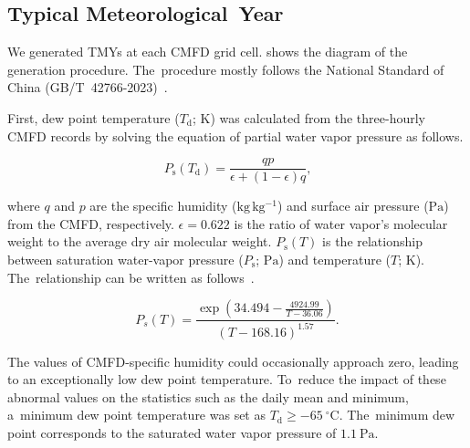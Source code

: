\documentclass[atmosphere,article,accept,pdftex,moreauthors]{Definitions/mdpi}
\begin{document}
\subsection{Typical Meteorological~Year}\label{sec:datamethods:tmy}

We generated TMYs at each CMFD grid cell.  shows the diagram of the generation procedure. The~procedure mostly follows the National Standard of China (GB/T~42766-2023)~\cite{GBT42766-2023}.

First, dew point temperature (\(T_\mathrm{d}\); \(\mathrm{K}\)) was calculated from the three-hourly CMFD records by solving the equation of partial water vapor pressure as follows.
\begin{linenomath}
  \begin{equation}
    P_\mathrm{s}(T_\mathrm{d}) = \frac{q p}{\epsilon + (1-\epsilon)q}  \text{,}
  \end{equation}
\end{linenomath}
where \(q\) and \(p\) are the specific humidity (\(\mathrm{kg\,kg^{-1}}\)) and surface air pressure (\(\mathrm{Pa}\)) from the CMFD, respectively. \(\epsilon=0.622\) is the ratio of water vapor's molecular weight to the average dry air molecular weight. \(P_\mathrm{s}(T)\) is the relationship between saturation water-vapor pressure (\(P_\mathrm{s}\); \(\mathrm{Pa}\)) and temperature (\(T\); \(\mathrm{K}\)). The~relationship can be written as follows~\cite{huang2018JAMC}.
\begin{linenomath}
  \begin{equation}
    P_s(T) = \frac{\exp(34.494 - \frac{4924.99}{T - 36.06})}{(T - 168.16)^{1.57}} \text{.}
  \end{equation}
\end{linenomath}

The values of CMFD-specific humidity could occasionally approach zero, leading to an exceptionally low dew point temperature. To~reduce the impact of these abnormal values on the statistics such as the daily mean and minimum, a~minimum dew point temperature was set as \(T_\mathrm{d} \ge -65~\mathrm{^\circ C}\). The~minimum dew point corresponds to the saturated water vapor pressure of \(1.1~\mathrm{Pa}\).
\end{document}
